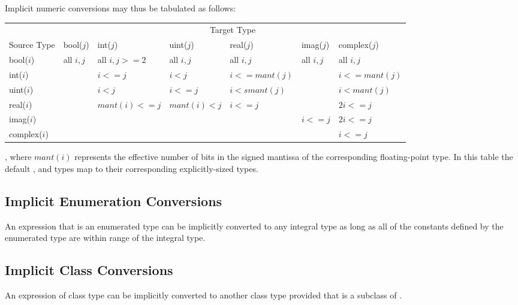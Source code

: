Implicit numeric conversions may thus be tabulated as follows:
\begin{center}
\begin{tabular}{l|llllll|}
\cline{2-7}
& \multicolumn{6}{c|}{Target Type} \\
Source Type & bool($j$) & int($j$) & uint($j$) & real($j$) & imag($j$) & complex($j$) \\ \cline{2-7}
bool($i$) & all $i,j$ & all $i,j>=2$ & all $i,j$ & all $i,j$ & all $i,j$ & all $i,j$ \\
int($i$) & & $i<=j$ & $i<j$ & $i<=mant(j)$ & & $i<=mant(j)$ \\
uint($i$) & & $i<j$ & $i<=j$ & $i<smant(j)$ & & $i<mant(j)$ \\
real($i$) & & $mant(i)<=j$ & $mant(i)<j$ & $i<=j$ & & $2i<=j$ \\
imag($i$) & & & & & $i<=j$ & $2i<=j$ \\
complex($i$) & & & & & & $i<=j$ \\ \cline{2-7}
\end{tabular}
\end{center}
, where $mant(i)$ represents the effective number of bits in the signed mantissa
of the corresponding floating-point type.  In this table the
default ,  and  types map to their corresponding
explicitly-sized types.

\subsection{Implicit Enumeration Conversions}
\label{Implicit_Enumeration_Conversions}

An expression that is an enumerated type can be implicitly converted
to any integral type as long as all of the constants defined by the
enumerated type are within range of the integral type.


\subsection{Implicit Class Conversions}
\label{Implicit_Class_Conversions}

An expression of class type  can be implicitly converted to
another class type  provided that  is a subclass
of .

